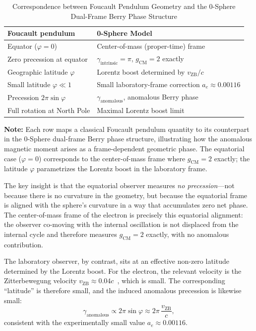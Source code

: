 \documentclass[%
 reprint,
 amsmath,amssymb,
 aps,
 prb,
]{revtex4-2}
\numberwithin{equation}{section}
\theoremstyle{definition}
\theoremstyle{remark}
\begin{document}
\begin{table}[t!]
\centering
\caption{Correspondence between Foucault Pendulum Geometry and the 0-Sphere Dual-Frame Berry Phase Structure}
\label{tab:foucault_correspondence}
\renewcommand{\arraystretch}{1.4}
\begin{tabular}{p{5.5cm}p{10.0cm}}
\toprule
\textbf{Foucault pendulum} & \textbf{0-Sphere Model} \\
\midrule
Equator ($\varphi = 0$) & Center-of-mass (proper-time) frame \\
\addlinespace[0.25cm]
Zero precession at equator & $\gamma_{\text{intrinsic}} = \pi$, $g_{\text{CM}} = 2$ exactly \\
\addlinespace[0.25cm]
Geographic latitude $\varphi$ & Lorentz boost determined by $v_{\text{ZB}}/c$ \\
\addlinespace[0.25cm]
Small latitude $\varphi \ll 1$ & Small laboratory-frame correction $a_e \approx 0.00116$ \\
\addlinespace[0.25cm]
Precession $2\pi\sin\varphi$ & $\gamma_{\text{anomalous}}$, anomalous Berry phase \\
\addlinespace[0.25cm]
Full rotation at North Pole & Maximal Lorentz boost limit \\
\bottomrule
\end{tabular}
\vspace{0.2cm}
\begin{flushleft}
\footnotesize
\textbf{Note:} Each row maps a classical Foucault pendulum quantity to its counterpart in the 0-Sphere dual-frame Berry phase structure, illustrating how the anomalous magnetic moment arises as a frame-dependent geometric phase. The equatorial case ($\varphi=0$) corresponds to the center-of-mass frame where $g_{\text{CM}}=2$ exactly; the latitude $\varphi$ parametrizes the Lorentz boost in the laboratory frame.
\end{flushleft}
\end{table}

The key insight is that the equatorial observer measures \emph{no precession}---not because there is no curvature in the geometry, but because the equatorial frame is aligned with the sphere's curvature in a way that accumulates zero net phase. The center-of-mass frame of the electron is precisely this equatorial alignment: the observer co-moving with the internal oscillation is not displaced from the internal cycle and therefore measures $g_{\text{CM}} = 2$ exactly, with no anomalous contribution.

The laboratory observer, by contrast, sits at an effective non-zero latitude determined by the Lorentz boost. For the electron, the relevant velocity is the Zitterbewegung velocity $v_{\text{ZB}} \approx 0.04c$~\cite{Hanamura_2025_26}, which is small. The corresponding ``latitude'' is therefore small, and the induced anomalous precession is likewise small:
\begin{equation}
\gamma_{\text{anomalous}} \propto 2\pi\sin\varphi \approx 2\pi\,\frac{v_{\text{ZB}}}{c},
\label{eq:foucault_gamma_anomalous}
\end{equation}
consistent with the experimentally small value $a_e \approx 0.00116$.
\end{document}
